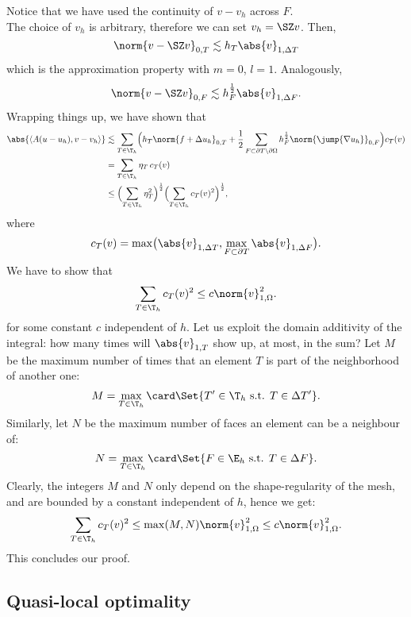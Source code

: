 Notice that we have used the continuity of $v-v_h$ across $F$.\\
 The choice of $v_h$ is arbitrary, therefore we can set $v_h = \SZ v$. Then,
\[
\norm{v-\SZ v}_{0,T} \lesssim h_T \abs{v}_{1,\Delta T}
\]
which is the approximation property with $m=0$, $l=1$. Analogously,
\[
\norm{v-\SZ v}_{0,F} \lesssim h_F^{\frac{1}{2}} \abs{v}_{1,\Delta F}.
\]
Wrapping things up, we have shown that
\begin{align}
\abs{\langle A(u-u_h),v-v_h \rangle} &\lesssim
\sum_{T \in \T_h} \Bigl( h_T \norm{f + \Delta u_h}_{0,T} +
    \frac{1}{2} \sum_{F \subset \partial T\setminus\partial\Omega} h_F^\frac{1}{2} \norm{\jump{\nabla u_h}}_{0,F} \Bigr) c_T(v) \\
    &= \sum_{T \in \T_h} \eta_T \, c_T(v) \\
    &\le \Bigl( \sum_{T \in \T_h} \eta_T^2 \Bigr)^\frac{1}{2}
    \Bigl( \sum_{T \in \T_h} c_T(v)^2 \Bigr)^\frac{1}{2},
\end{align}
where
\[
c_T(v) = \max \bigl( \abs{v}_{1,\Delta T}, \max_{F \subset \partial T} \abs{v}_{1,\Delta F} \bigr).
\]
 We have to show that
\[
\sum_{T \in \T_h} c_T(v)^2 \le c \norm{v}_{1,\Omega}^2.
\]
for some constant $c$ independent of $h$. Let us exploit the domain additivity of the integral: how many times will $\abs{v}_{1,T}$ show up, at most, in the sum? Let $M$ be the maximum number of times that an element $T$ is part of the neighborhood of another one:
\[
M = \max_{T \in \T_h} \card \Set{T'\in\T_h \text{ s.t. } T \in \Delta T'}.
\]
Similarly, let $N$ be the maximum number of faces an element can be a neighbour of:
\[
N = \max_{T \in \T_h} \card \Set{F\in\E_h \text{ s.t. } T \in \Delta F}.
\]
Clearly, the integers $M$ and $N$ only depend on the shape-regularity of the mesh, and are bounded by a constant independent of $h$, hence we get:
\[
\sum_{T \in \T_h} c_T(v)^2 \le \max(M,N) \norm{v}_{1,\Omega}^2
\le c \norm{v}_{1,\Omega}^2.
\]
This concludes our proof.


\subsection{Quasi-local optimality}

